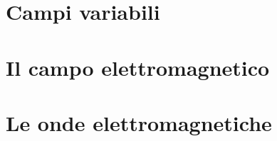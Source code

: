 \chapter{Campi variabili}


\chapter{Il campo elettromagnetico}


\chapter{Le onde elettromagnetiche}


